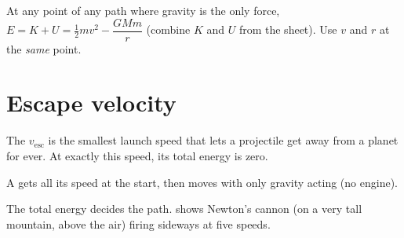 At any point of any path where gravity is the only force,
$E = K + U = \tfrac{1}{2}mv^2 - \dfrac{GMm}{r}$ (combine $K$ and $U$ from the
sheet). Use $v$ and $r$ at the \emph{same} point.

\section{Escape velocity}\label{ch5:sec:escape}

\begin{bigidea}
The  $v_\mathrm{esc}$ is the smallest launch speed that
lets a projectile get away from a planet for ever. At exactly this speed, its
total energy is zero.
\end{bigidea}

A  gets all its speed at the start, then moves with only
gravity acting (no engine).

The total energy decides the path.  shows Newton's cannon
(on a very tall mountain, above the air) firing sideways at five speeds.

